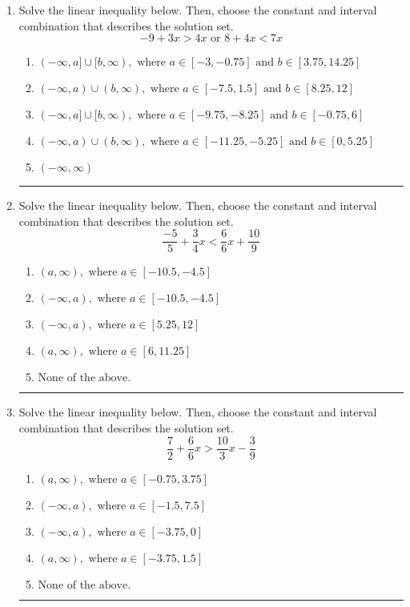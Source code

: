 \documentclass[14pt]{extbook}
\newcommand{\litem}[1]{\item#1\hspace*{-1cm}\rule{\textwidth}{0.4pt}}
\begin{document}
\begin{enumerate}
{\begin{enumerate}[label=\Alph*.]
\end{enumerate} }
\litem{
Solve the linear inequality below. Then, choose the constant and interval combination that describes the solution set.\[ -9 + 3 x > 4 x \text{ or } 8 + 4 x < 7 x \]\begin{enumerate}[label=\Alph*.]
\item \( (-\infty, a] \cup [b, \infty), \text{ where } a \in [-3, -0.75] \text{ and } b \in [3.75, 14.25] \)
\item \( (-\infty, a) \cup (b, \infty), \text{ where } a \in [-7.5, 1.5] \text{ and } b \in [8.25, 12] \)
\item \( (-\infty, a] \cup [b, \infty), \text{ where } a \in [-9.75, -8.25] \text{ and } b \in [-0.75, 6] \)
\item \( (-\infty, a) \cup (b, \infty), \text{ where } a \in [-11.25, -5.25] \text{ and } b \in [0, 5.25] \)
\item \( (-\infty, \infty) \)

\end{enumerate} }
\litem{
Solve the linear inequality below. Then, choose the constant and interval combination that describes the solution set.\[ \frac{-5}{5} + \frac{3}{4} x < \frac{6}{6} x + \frac{10}{9} \]\begin{enumerate}[label=\Alph*.]
\item \( (a, \infty), \text{ where } a \in [-10.5, -4.5] \)
\item \( (-\infty, a), \text{ where } a \in [-10.5, -4.5] \)
\item \( (-\infty, a), \text{ where } a \in [5.25, 12] \)
\item \( (a, \infty), \text{ where } a \in [6, 11.25] \)
\item \( \text{None of the above}. \)

\end{enumerate} }
\litem{
Solve the linear inequality below. Then, choose the constant and interval combination that describes the solution set.\[ \frac{7}{2} + \frac{6}{6} x > \frac{10}{3} x - \frac{3}{9} \]\begin{enumerate}[label=\Alph*.]
\item \( (a, \infty), \text{ where } a \in [-0.75, 3.75] \)
\item \( (-\infty, a), \text{ where } a \in [-1.5, 7.5] \)
\item \( (-\infty, a), \text{ where } a \in [-3.75, 0] \)
\item \( (a, \infty), \text{ where } a \in [-3.75, 1.5] \)
\item \( \text{None of the above}. \)


\end{enumerate}}
\end{enumerate}
\end{document}
